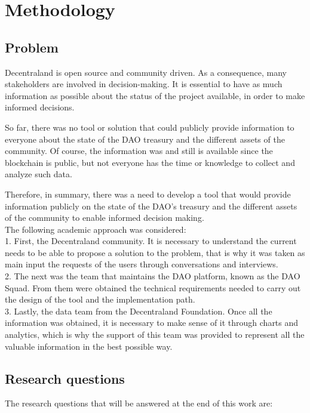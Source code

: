 \documentclass[MSE,Master,english]{twbook}%
\begin{document}
\chapter{Methodology\label{method}}
\section{Problem}
Decentraland is open source and community driven. As a consequence, many stakeholders are involved in decision-making. It is essential to have as much information as possible about the status of the project available, in order to make informed decisions.

So far, there was no tool or solution that could publicly provide information to everyone about the state of the \gls{DAO} treasury and the different assets of the community. Of course, the information was and still is available since the blockchain is public, but not everyone has the time or knowledge to collect and analyze such data.

Therefore, in summary, there was a need to develop a tool that would provide information publicly on the state of the DAO's treasury and the different assets of the community to enable informed decision making. \\

The following academic approach was considered: \\

1. First, the Decentraland community. It is necessary to understand the current needs to be able to propose a solution to the problem, that is why it was taken as main input the requests of the users through conversations and interviews. \\

2. The next was the team that maintains the \gls{DAO} platform, known as the \gls{DAO} Squad. From them were obtained the technical requirements needed to carry out the design of the tool and the implementation path.\\

3. Lastly, the data team from the Decentraland Foundation. Once all the information was obtained, it is necessary to make sense of it through charts and analytics, which is why the support of this team was provided to represent all the valuable information in the best possible way.\\

\section{Research questions\label{research}}
The research questions that will be answered at the end of this work are: \\
\end{document}
